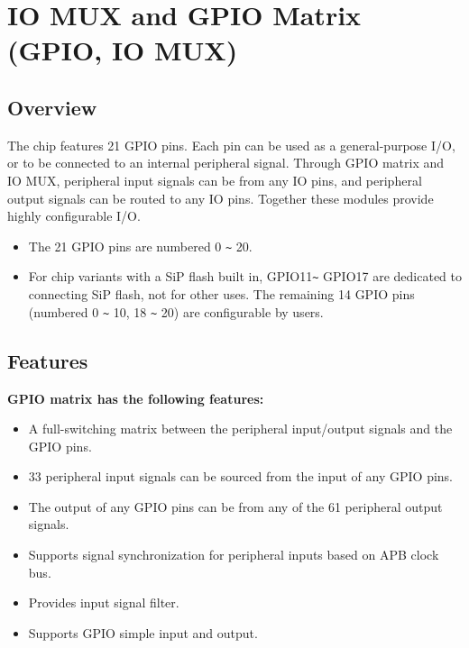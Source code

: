 \documentclass[main\_\_EN.tex]{subfiles}
\begin{document}

\ifglobal
\else
    {\let\clearpage\relax \listoftodos}
    \tableofcontents
\fi



\hypertarget{iomuxgpio}{}
\chapter{IO MUX and GPIO Matrix (GPIO, IO MUX)}
\label{mod:iomuxgpio}

\section{Overview}

The \chipname{} chip features 21 GPIO pins. Each pin can be used as a general-purpose I/O, or to be connected to an internal peripheral signal. Through GPIO matrix and IO MUX, peripheral input signals can be from any IO pins, and peripheral output signals can be routed to any IO pins. Together these modules provide highly configurable I/O.


\begin{tiplisting}
\vspace{-2em}
\begin{itemize}
\item The 21 GPIO pins are numbered 0 \verb+~+ 20.
\item For chip variants with a SiP flash built in, GPIO11\verb+~+ GPIO17 are dedicated to connecting SiP flash, not for other uses. The remaining 14 GPIO pins (numbered 0 \verb+~+ 10, 18 \verb+~+ 20) are configurable by users.
\end{itemize}
\end{tiplisting}

\section{Features}

\textbf{GPIO matrix has the following features:}

\begin{itemize}
\item A full-switching matrix between the peripheral input/output signals and the GPIO pins.
\item 33 peripheral input signals can be sourced from the input of any GPIO pins.
\item The output of any GPIO pins can be from any of the 61 peripheral output signals.
\item Supports signal synchronization for peripheral inputs based on APB clock bus.
\item Provides input signal filter.
\item Supports GPIO simple input and output.
\end{itemize}
\end{document}
